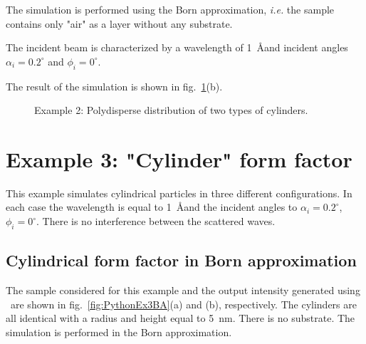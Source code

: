 The simulation is performed using the Born approximation, \textit{i.e.} the sample contains only "air" as a layer without any substrate.

The incident beam is characterized by a wavelength of 1~\AA and incident angles
$\alpha_i=0.2^{\circ}$ and $\phi_i=0^{\circ}$.

The result of the simulation is shown in fig.~\ref{fig:PythonEx2}(b). 

\begin{figure}[H]
\hfill
{}
\hfill
{}
\hfill
\caption{Example 2: Polydisperse distribution of two types of cylinders.}
\label{fig:PythonEx2}
\end{figure}

\newpage
\section{Example 3: "Cylinder" form factor}
This example simulates cylindrical particles in three different configurations.
In each case the wavelength is equal to 1~\AA and the incident angles to $\alpha_i=0.2^{\circ}$, $\phi_i=0^{\circ}$. There is no interference between the scattered waves.

\subsection{Cylindrical form factor in Born approximation} \label{sec:ex003CylinderBA}
The sample considered for this example and the output intensity generated using \BornAgain\ are shown in fig.~\ref{fig:PythonEx3BA}(a) and (b), respectively. The cylinders are all identical with a radius and height equal to 5~nm. There is no substrate. The simulation is performed in the Born approximation.

